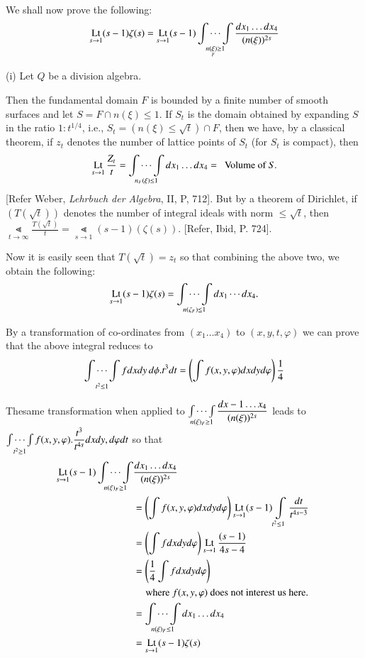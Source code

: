 We shall now prove the following: 
$$
\operatorname*{Lt}_{ s \to 1}(s - 1) \zeta (s) = \operatorname*{Lt}_{ s \to 1} (s - 1)
\operatorname*{\int\cdots\int}_{n\underset{F}{(\xi)}\geq 1} \frac{dx_1 \ldots dx_4}{(n(\xi ))^{2s}}
$$

\noindent (i) Let $Q$ be a division algebra. 

  Then the fundamental domain $F$ is bounded by a finite number of
  smooth surfaces and let $S = F \cap n(\xi) \leq 1$. If $S_t$ is the
  domain obtained by expanding $S$ in the ratio $ 1 : t^{
    1/4}$, i.e., $S_t = (n (\xi)\leq \sqrt{t})\cap F$, then
  we have, by a classical theorem, if $z_t$ denotes the number of
  lattice points of $S_t$ (for $S_t$ is compact), then  
  $$
  \operatorname*{Lt}\limits_{ s \to 1} \frac{Z_t}{t} = \operatorname*{\int\cdots\int}_{n_F (\xi)\leq 1 }
  dx_1\ldots dx_4 = ~\text{ Volume of}~ S.    
  $$
  [Refer Weber, \textit{Lehrbuch der Algebra},  II,  P,  712]. But by
  a theorem of Dirichlet, if $(T(\sqrt{t}))$ denotes the number of
  integral ideals with norm $\leq \sqrt{t}$, then  $\Lt\limits_{t \to \infty}
  \frac{T(\sqrt{t})}{t} = \Lt\limits_{ s \to
    1}(s-1) (\zeta(s))$. [Refer, Ibid, P. 724].  

  Now it is easily seen that $T(\sqrt{t}) = z_t$ so that combining the
  above two, we obtain the following:  
  $$
  \operatorname*{Lt}\limits_{ s \to 1} (s-1)\zeta(s) = \operatorname*{\int\cdots\int}_{n (\zeta_F) \leq 1} dx_1 \cdots dx_4. 
  $$

  By a transformation of co-ordinates from $(x_1 \ldots x_4)$ to $(x,
  y, t,  \varphi)$ we can prove that the above integral reduces to  
  $$
  \operatorname*{\int\cdots\int}_{t^2 \leq 1} fd x dy \,d\phi.  t^3 dt = \left(\int f(x, y, \varphi)
  dx dy d \varphi \right) \frac{1}{4} 
  $$

  The\pageoriginale same transformation when applied to $\operatorname*{\int\cdots\int}\limits_{n(\xi)_F \geq
    1}\dfrac{dx-1 \ldots x_4}{(n(\xi))^{2s}}$ leads to
  $\operatorname*{\int\cdots\int}\limits_{t^2 \geq 1}f(x, y,  \varphi). \dfrac{t^3}{t^{4s}} dx
  dy,  d \varphi  dt $ so that  
  \begin{align*}
    \operatorname*{Lt}_{ s \to 1}(s-1)   \operatorname*{\int\cdots\int}_{n(\xi)_F \geq 1} & \frac{dx_1 \ldots
      dx_4}{(n(\xi))^{2s}}\\ & = \left(\int f (x,  y,  \varphi ) dx dy d
    \varphi \right) \operatorname*{Lt}_{ s \to 1}(s-1) \int\limits_{ t^2 \leq 1}
    \frac{dt}{t^{4 s- 3}} \\ 
    & = \left( \int f dx dy d \varphi\right) \operatorname*{Lt}_{ s \to 1} \frac{(s -
      1)}{ 4 s - 4 }\\ 
    & =  \left(\frac{ 1}{4} \int f dx dy d \varphi \right)\\
    & \quad \text{ where $f ( x, y, \varphi) $ does not interest us here. }\\
    & = \operatorname*{\int\cdots\int}_{ n (\xi) _F \leq 1} dx_1 \ldots dx_4 \\
    & = \operatorname*{Lt} _{  s \to 1} (s - 1) \zeta (s)
  \end{align*}


